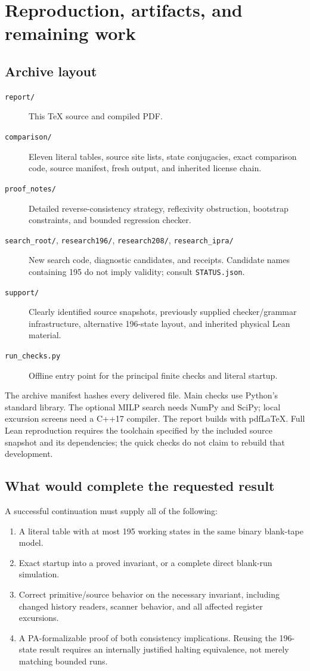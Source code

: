 \documentclass[11pt,a4paper]{article}
\newcommand{\code}[1]{\nolinkurl{#1}}
\begin{document}
\section{Reproduction, artifacts, and remaining work}

\subsection{Archive layout}

\begin{description}
\item[\code{report/}] This TeX source and compiled PDF.
\item[\code{comparison/}] Eleven literal tables, source site lists, state conjugacies, exact comparison code, source manifest, fresh output, and inherited license chain.
\item[\code{proof_notes/}] Detailed reverse-consistency strategy, reflexivity obstruction, bootstrap constraints, and bounded regression checker.
\item[\code{search_root/}, \code{research196/}, \code{research208/}, \code{research_ipra/}] New search code, diagnostic candidates, and receipts. Candidate names containing 195 do not imply validity; consult \code{STATUS.json}.
\item[\code{support/}] Clearly identified source snapshots, previously supplied checker/grammar infrastructure, alternative 196-state layout, and inherited physical Lean material.
\item[\code{run_checks.py}] Offline entry point for the principal finite checks and literal startup.
\end{description}

The archive manifest hashes every delivered file. Main checks use Python's standard library. The optional MILP search needs NumPy and SciPy; local excursion screens need a C++17 compiler. The report builds with pdfLaTeX. Full Lean reproduction requires the toolchain specified by the included source snapshot and its dependencies; the quick checks do not claim to rebuild that development.

\newpage
\subsection{What would complete the requested result}

A successful continuation must supply all of the following:
\begin{enumerate}
\item A literal table with at most 195 working states in the same binary blank-tape model.
\item Exact startup into a proved invariant, or a complete direct blank-run simulation.
\item Correct primitive/source behavior on the necessary invariant, including changed history readers, scanner behavior, and all affected register excursions.
\item A PA-formalizable proof of both consistency implications. Reusing the 196-state result requires an internally justified halting equivalence, not merely matching bounded runs.
\end{enumerate}
\end{document}

